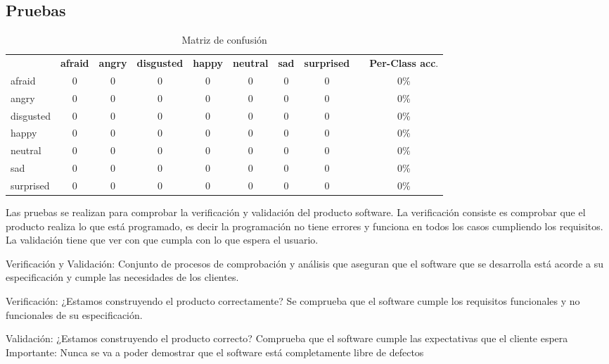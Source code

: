 \documentclass[a4paper,11pt]{book}
\begin{document}
\subsection{Pruebas}
\begin{table}[h]
	\centering
	\small
	\setlength\tabcolsep{3pt}
	\setlength\extrarowheight{2pt}
	\label{my-label}
	\begin{tabular}{lccccccccc}
		& \textbf{afraid} & \textbf{angry} & \textbf{disgusted} & \textbf{happy} & \textbf{neutral} & \textbf{sad} & \textbf{surprised} &  & \textbf{Per-Class acc}. \\
		afraid    & 0      & 0     & 0         & 0     & 0       & 0   & 0         &  & 0\%            \\
		angry     & 0      & 0     & 0         & 0     & 0       & 0   & 0         &  & 0\%            \\
		disgusted & 0      & 0     & 0         & 0     & 0       & 0   & 0         &  & 0\%            \\
		happy     & 0      & 0     & 0         & 0     & 0       & 0   & 0         &  & 0\%            \\
		neutral   & 0      & 0     & 0         & 0     & 0       & 0   & 0         &  & 0\%            \\
		sad       & 0      & 0     & 0         & 0     & 0       & 0   & 0         &  & 0\%            \\
		surprised & 0      & 0     & 0         & 0     & 0       & 0   & 0         &  & 0\%           
	\end{tabular}
	\caption{Matriz de confusión}
\end{table}

Las pruebas se realizan para comprobar la verificación y validación del producto software. La verificación consiste es comprobar que el producto realiza lo que está programado, es decir la programación no tiene errores y funciona en todos los casos cumpliendo los requisitos. La validación tiene que ver con que cumpla con lo que espera el usuario.

Verificación y Validación: Conjunto de procesos de comprobación y
análisis que aseguran que el software que se desarrolla está acorde a su
especificación y cumple las necesidades de los clientes.

Verificación:
¿Estamos construyendo el producto correctamente?
Se comprueba que el software cumple los requisitos funcionales y no funcionales
de su especificación.

Validación:
¿Estamos construyendo el producto correcto?
Comprueba que el software cumple las expectativas que el cliente espera
Importante: Nunca se va a poder demostrar que el software está
completamente libre de defectos
\end{document}
